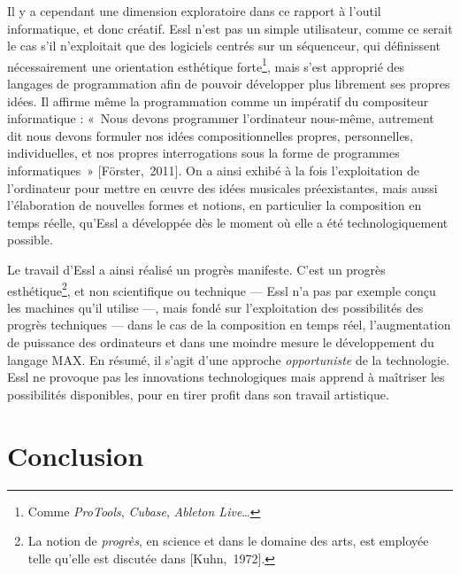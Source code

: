 \documentclass[a4paper,12pt]{article}
\newcommand{\guill}[1]{«~#1~»}
\newcommand{\zitat}[2]{\#Citation(#2)\#}
\newcommand{\cicite}[1]{{\footnotesize[#1]}}
\begin{document}
Il y a cependant une dimension exploratoire dans ce rapport à l'outil informatique, et donc créatif. Essl n'est pas un simple utilisateur, comme ce serait le cas s'il n'exploitait que des logiciels centrés sur un séquenceur, qui définissent nécessairement une orientation esthétique forte\footnote{Comme \emph{ProTools}, \emph{Cubase}, \emph{Ableton Live}\dots}, mais s'est approprié des langages de programmation afin de pouvoir développer plus librement ses propres idées. Il affirme même la programmation comme un impératif du compositeur informatique : \guill{Nous devons programmer l'ordinateur nous-même, autrement dit nous devons formuler nos idées compositionnelles propres, personnelles, individuelles, et nos propres interrogations sous la forme de programmes informatiques} \cicite{Förster,~2011}. On a ainsi exhibé à la fois l'exploitation de l'ordinateur pour mettre en œuvre des idées musicales préexistantes, mais aussi l'élaboration de nouvelles formes et notions, en particulier la composition en temps réelle, qu'Essl a développée dès le moment où elle a été technologiquement possible.

Le travail d'Essl a ainsi réalisé un progrès manifeste. C'est un progrès esthétique\footnote{La notion de \emph{progrès}, en science et dans le domaine des arts, est employée telle qu'elle est discutée dans \cicite{Kuhn,~1972}.}, et non scientifique ou technique --- Essl n'a pas par exemple conçu les machines qu'il utilise ---, mais fondé sur l'exploitation des possibilités des progrès techniques --- dans le cas de la composition en temps réel, l'augmentation de puissance des ordinateurs et dans une moindre mesure le développement du langage MAX. En résumé, il s'agit d'une approche \emph{opportuniste} de la technologie. Essl ne provoque pas les innovations technologiques mais apprend à maîtriser les possibilités disponibles, pour en tirer profit dans son travail artistique.



\section{Conclusion}
\end{document}
